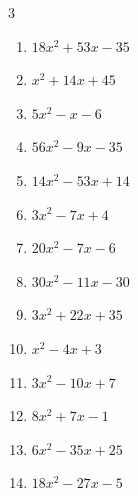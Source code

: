 \begin{multicols}{3}
\begin{enumerate}
        \phantom{$=(7x+1)(3x-4)$}

  \item $18x^{2}+53x-35$

        \phantom{$=(2x+7)(9x-5)$}

  \item $x^{2}+14x+45$

        \phantom{$=(x+5)(x+9)$}

  \item $5x^{2}-x-6$

        \phantom{$=(5x-6)(x+1)$}

  \item $56x^{2}-9x-35$

        \phantom{$=(7x+5)(8x-7)$}

  \item $14x^{2}-53x+14$

        \phantom{$=(7x-2)(2x-7)$}

  \item $3x^{2}-7x+4$

        \phantom{$=(3x-4)(x-1)$}

\columnbreak %

\resetques

  \item $20x^{2}-7x-6$

        \phantom{$=(4x-3)(5x+2)$}

  \item $30x^{2}-11x-30$

        \phantom{$=(6x+5)(5x-6)$}

  \item $3x^{2}+22x+35$

        \phantom{$=(x+5)(3x+7)$}

  \item $x^{2}-4x+3$

        \phantom{$=(x-1)(x-3)$}

  \item $3x^{2}-10x+7$

        \phantom{$=(x-1)(3x-7)$}

  \item $8x^{2}+7x-1$

        \phantom{$=(x+1)(8x-1)$}

  \item $6x^{2}-35x+25$

        \phantom{$=(x-5)(6x-5)$}

  \item $18x^{2}-27x-5$


\end{enumerate}
\end{multicols}

